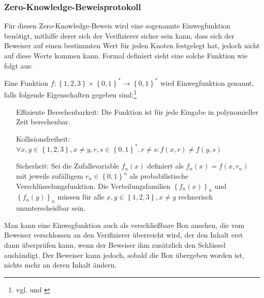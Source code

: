 \subsubsection{Zero-Knowledge-Beweisprotokoll}
Für diesen Zero-Knowledge-Beweis wird eine sogenannte Einwegfunktion benötigt, mithilfe derer sich der Verifizierer sicher sein kann, dass sich der Beweiser auf einen bestimmten Wert für jeden Knoten festgelegt hat, jedoch nicht auf diese Werte kommen kann. Formal definiert sieht eine solche Funktion wie folgt aus:

\begin{definition}[Einwegfunktion]
Eine Funktion \( f: \left\lbrace 1, 2, 3\right\rbrace \times \left\lbrace 0, 1\right\rbrace ^{\ast} \rightarrow \left\lbrace 0, 1\right\rbrace ^{\ast} \) wird Einwegfunktion genannt, falls folgende Eigenschaften gegeben sind:\footnote{vgl. \cite[Definition 6]{np} und \cite[Definition 2]{20yearszeroknowledge}}

\begin{itemize}
\item[Effiziente Berechenbarkeit:] Die Funktion ist für jede Eingabe in polynomieller Zeit berechenbar.
\item[Kollisionsfreiheit:] \( \forall x, y \in \left\lbrace 1, 2, 3\right\rbrace, x \neq y, r, s \in  \left\lbrace 0, 1\right\rbrace ^{\ast}, r \neq s: f \left( x, r \right) \neq f \left( y, s \right) \)
\item[Sicherheit:] Sei die Zufallsvariable \( f_n \left( x \right) \) definiert als \( f_n \left( x \right) = f \left( x, r_n \right) \) mit jeweils zu\-fäl\-li\-gem \( r_n \in \left\lbrace 0, 1\right\rbrace ^{ n } \) als probabilistische Verschlüsselungsfunktion.
Die Verteilungsfamilien \( \left\lbrace f_n \left( x\right) \right\rbrace_n \) und \( \left\lbrace f_n \left( y\right) \right\rbrace_n \) müssen für alle \( x, y \in \left\lbrace 1, 2, 3\right\rbrace, x \neq y \) rechnerisch ununterscheidbar sein.
\end{itemize}
\end{definition}

Man kann eine Einwegfunktion auch als verschließbare Box ansehen, die vom Beweiser verschlossen an den Verifizierer überreicht wird, der den Inhalt erst dann überprüfen kann, wenn der Beweiser ihm zusätzlich den Schlüssel aushändigt. Der Beweiser kann jedoch, sobald die Box übergeben worden ist, nichts mehr an deren Inhalt ändern.

